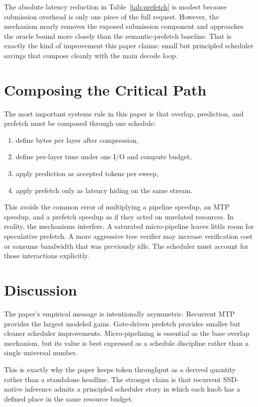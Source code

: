 \documentclass[11pt]{article}
\begin{document}
The absolute latency reduction in Table~\ref{tab:prefetch} is modest because submission overhead is only one piece of the full request. However, the mechanism nearly removes the exposed submission component and approaches the oracle bound more closely than the semantic-prefetch baseline. That is exactly the kind of improvement this paper claims: small but principled scheduler savings that compose cleanly with the main decode loop.

\section{Composing the Critical Path}
The most important systems rule in this paper is that overlap, prediction, and prefetch must be composed through one schedule:
\begin{enumerate}
    \item define bytes per layer after compression,
    \item define per-layer time under one I/O and compute budget,
    \item apply prediction as accepted tokens per sweep,
    \item apply prefetch only as latency hiding on the same stream.
\end{enumerate}

This avoids the common error of multiplying a pipeline speedup, an MTP speedup, and a prefetch speedup as if they acted on unrelated resources. In reality, the mechanisms interfere. A saturated micro-pipeline leaves little room for speculative prefetch. A more aggressive tree verifier may increase verification cost or consume bandwidth that was previously idle. The scheduler must account for those interactions explicitly.

\section{Discussion}
The paper's empirical message is intentionally asymmetric. Recurrent MTP provides the largest modeled gains. Gate-driven prefetch provides smaller but cleaner scheduler improvements. Micro-pipelining is essential as the base overlap mechanism, but its value is best expressed as a schedule discipline rather than a single universal number.

This is exactly why the paper keeps token throughput as a derived quantity rather than a standalone headline. The stronger claim is that recurrent SSD-native inference admits a principled scheduler story in which each knob has a defined place in the same resource budget.
\end{document}
